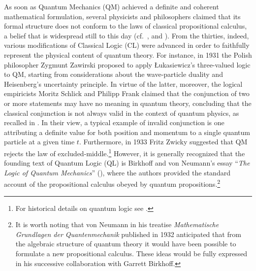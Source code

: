 \documentclass[11pt, executivepaper]{article}
\begin{document}
As soon as Quantum Mechanics (QM) achieved a definite and coherent mathematical formulation, several physicists and philosophers claimed that its formal structure does not conform to the laws of classical propositional calculus, a belief that is widespread still to this day (cf.\ \cite{Giuntini:2002}, \cite{DallaChiara:2004} and \cite{deRonde:2016}). From the thirties, indeed, various modifications of Classical Logic (CL) were advanced in order to faithfully represent the physical content of quantum theory. For instance, in 1931 the Polish philosopher Zygmunt Zawirski proposed to apply \L ukasiewicz's three-valued logic to QM, starting from considerations about the wave-particle duality and Heisenberg's uncertainty principle. In virtue of the latter, moreover, the logical empiricists Moritz Schlick and Philipp Frank claimed that the conjunction of two or more statements may have no meaning in quantum theory, concluding that the classical conjunction is not always valid in the context of quantum physics, as recalled in \cite{Carnap:1966}. In their view, a typical example of invalid conjunction is one attributing a definite value for both position and momentum to a single quantum particle at a given time $t$. Furthermore, in 1933 Fritz Zwicky suggested that QM rejects the law of excluded-middle.\footnote{For historical details on quantum logic see \cite{Jammer:1974}.} However, it is generally recognized that the founding text of Quantum Logic (QL) is Birkhoff and von Neumann's essay ``\emph{The Logic of Quantum Mechanics}'' (\cite{vonNeumann:1936}), where the authors provided the standard account of the propositional calculus obeyed by quantum propositions.\footnote{It is worth noting that von Neumann in his treatise \emph{Mathematische Grundlagen der Quantenmechanik} published in 1932 anticipated that from the algebraic structure of quantum theory it would have been possible to formulate a new propositional calculus. These ideas would be fully expressed in his successive collaboration with Garrett Birkhoff.}
\end{document}
